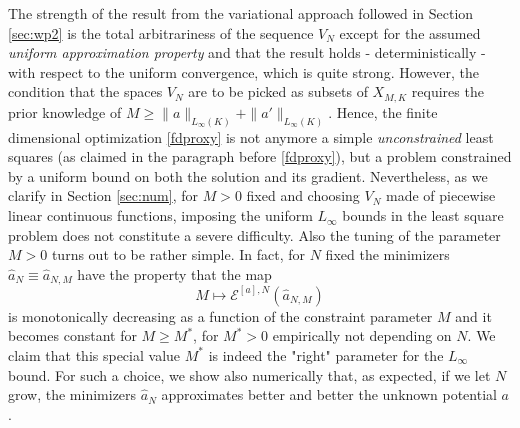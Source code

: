 The strength of the result from the variational approach followed in Section \ref{sec:wp2} is the total arbitrariness of the sequence $V_N$ except
for the assumed {\it uniform approximation property} and that the result holds - deterministically - with respect to the uniform convergence, which is quite strong.  However,
the condition that the spaces $V_N$ are to be picked as subsets of $X_{M,K}$ requires the prior knowledge of $M \geq \|a\|_{L_{\infty}(K)} + \|a'\|_{L_{\infty}(K)}$. Hence, the finite dimensional optimization \eqref{fdproxy} is not anymore a simple {\it unconstrained} least squares (as claimed in the paragraph before \eqref{fdproxy}),
but a problem constrained by a uniform bound on both the solution and its gradient. Nevertheless,
as we clarify in Section \ref{sec:num}, for $M>0$ fixed and choosing $V_N$ made of piecewise linear continuous functions, imposing the uniform $L_\infty$ bounds in the least square problem does not constitute a severe difficulty.
Also the tuning of the parameter $M>0$ turns out to be rather simple. In fact, for $N$ fixed the minimizers $\widehat a_N \equiv \widehat a_{N,M}$ have the property that the map
$$
 M \mapsto   \mathcal E^{[a],N}(\widehat a_{N,M})
$$
is monotonically decreasing as a function of the constraint parameter $M$ and it becomes constant for $M\geq M^*$, for $M^*>0$ empirically not depending on $N$. We claim that this special value $M^*$ is indeed the "right" parameter for the $L_\infty$ bound. For such a choice, we show also numerically that, as expected, if we let $N$ grow, the minimizers $\widehat{a}_N$ approximates better and better the unknown potential $a$. 
\\

